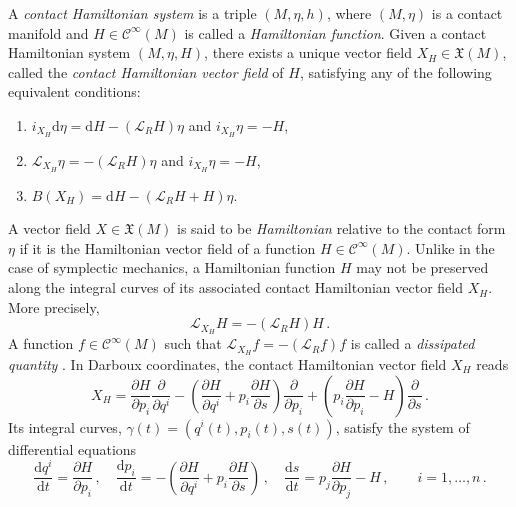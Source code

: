\documentclass[11pt]{article}
\theoremstyle{plain}
\theoremstyle{definition}
\renewcommand{\d}{\mathrm{d}}
\newcommand{\Cinfty}{\mathscr{C}^\infty}
\newcommand{\Lie}{\mathscr{L}}
\newcommand{\X}{\mathfrak{X}}
\newcommand{\parder}[2]{\frac{\partial #1}{\partial #2}}
\def\d{\mathrm{d}}
\def\X{\mathfrak{X}}
\def\d{\mathrm{d}}
\def\Lie{\mathscr{L}}
\begin{document}
A {\sl contact Hamiltonian system} \cite{BCT_17,LL_19,GGMRR_20a} is a triple $(M,\eta,h)$, where $(M,\eta)$ is a contact manifold and $H\in\Cinfty(M)$ is called a \textsl{Hamiltonian function}. Given a contact Hamiltonian system $(M,\eta,H)$, there exists a unique vector field $X_H\in\X(M)$, called the {\sl  contact Hamiltonian vector field} of $H$, satisfying any of the following equivalent conditions:
\begin{enumerate}[(1)]
    \item $i_{X_H}\d\eta = \d H - (\Lie_R H)\eta$ \quad and \quad $i_{X_H}\eta = -H$,
    \item $\Lie_{X_H}\eta = -(\Lie_R H)\eta$ \quad and \quad $ i_{X_H}\eta = -H$,
    \item $B(X_H) = \d H - (\Lie_R H + H)\eta$. 
\end{enumerate}
A vector field $X\in\X(M)$ is said to be \textsl{Hamiltonian} relative to the contact form $\eta$ if it is the Hamiltonian vector field of a function $H\in\Cinfty(M)$. Unlike in the case of symplectic mechanics, a Hamiltonian function $H$ may not be preserved along the integral curves of its associated contact Hamiltonian vector field $X_H$. More precisely,
$$ \Lie_{X_H}H = -(\Lie_R H)H\,. $$
A function $f\in\Cinfty(M)$ such that $\Lie_{X_H}f = -(\Lie_Rf)f$ is called a \textsl{dissipated quantity} \cite{GGMRR_20a}.
In Darboux coordinates, the contact Hamiltonian vector field $X_H$ reads
\begin{equation}\label{Eq:HamCoor} X_H = \parder{H}{p_i}\parder{}{q^i} - \left( \parder{H}{q^i} + p_i\parder{H}{s} \right)\parder{}{p_i} + \left( p_i\parder{H}{p_i} - H \right)\parder{}{s}\,. \end{equation}
Its integral curves, $\gamma(t) = (q^i(t), p_i(t), s(t))$, satisfy the system of differential equations
$$
    \frac{\d q^i}{\d t} = \parder{H}{p_i}\,,\quad
    \frac{\d p_i}{\d t} = - \left( \parder{H}{q^i} + p_i\parder{H}{s} \right)\,,\quad
    \frac{\d s}{\d t} = p_j\parder{H}{p_j} - H\,,\qquad i = 1,\dotsc,n\,.
$$
\end{document}
